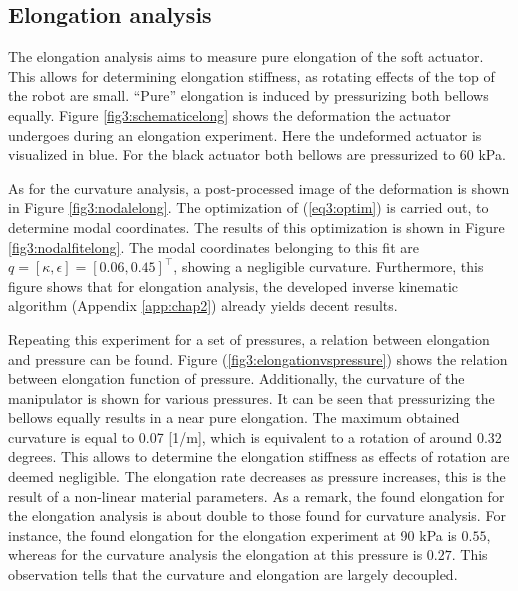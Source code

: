 \subsection{Elongation analysis}


The elongation analysis aims to measure pure elongation of the soft actuator. This allows for determining elongation stiffness, as rotating effects of the top of the robot are small. ``Pure'' elongation is induced by pressurizing both bellows equally. Figure \ref{fig3:schematicelong} shows the deformation the actuator undergoes during an elongation experiment. Here the undeformed actuator is visualized in blue. For the black actuator both bellows are pressurized to 60 kPa. 

As for the curvature analysis, a post-processed image of the deformation is shown in Figure \ref{fig3:nodalelong}. The optimization of (\ref{eq3:optim}) is carried out, to determine modal coordinates. The results of this optimization is shown in Figure \ref{fig3:nodalfitelong}. The modal coordinates belonging to this fit are  $q = [\kappa,\epsilon] = [0.06, 0.45]^\top$, showing a negligible curvature. Furthermore, this figure shows that for elongation analysis, the developed inverse kinematic algorithm (Appendix \ref{app:chap2}) already yields decent results.  

Repeating this experiment for a set of pressures, a relation between elongation and pressure can be found. Figure (\ref{fig3:elongationvspressure}) shows the relation between elongation function of pressure. Additionally, the curvature of the manipulator is shown for various pressures. It can be seen that pressurizing the bellows equally results in a near pure elongation. The maximum obtained curvature is equal to 0.07 [1/m], which is equivalent to a rotation of around 0.32 degrees. This allows to determine the elongation stiffness as effects of rotation are deemed negligible. The elongation rate decreases as pressure increases, this is the result of a non-linear material parameters. As a remark, the found elongation for the elongation analysis is about double to those found for curvature analysis. For instance, the found elongation for the elongation experiment at 90 kPa is $0.55$, whereas for the curvature analysis the elongation at this pressure is $0.27$. This observation tells that the curvature and elongation are largely decoupled.




